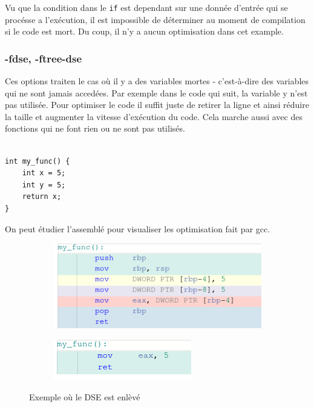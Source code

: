 \documentclass[11pt]{article} %
\begin{document}
Vu que la condition dans le \verb|if| est dependant sur une donn\'ee d'entr\'ee qui se proc\'esse a l'ex\'ecution, il est impossible de d\'eterminer
au moment de compilation si le code est mort. Du coup, il n'y a aucun optimisation dans cet example.

\subsubsection*{-fdse, -ftree-dse}

Ces options traiten le cas o\`u il y a des variables mortes - c'est-\`a-dire des variables qui ne sont jamais acced\'ees.
Par exemple dans le code qui suit, la variable y n’est pas utilisée. Pour optimiser le code il suffit juste de retirer la ligne et ainsi
réduire la taille et augmenter la vitesse d’exécution du code. Cela marche aussi avec des fonctions qui ne font rien ou ne sont pas utilisés.

\begin{verbatim}

int my_func() {
    int x = 5;
    int y = 5;
    return x;
}
\end{verbatim}


On peut \'etudier l'assembl\'e pour visualiser les optimisation fait par gcc.

\begin{figure}[h!]
    \centering
    \begin{subfigure}[h!]{0.4\textwidth}
        \includegraphics[width=\linewidth]{media/myfuncO0.png}
    \end{subfigure}
    \begin{subfigure}[h!]{0.4\textwidth}
        \includegraphics[width=\linewidth]{media/myfuncO1.png}
    \end{subfigure}
    \caption{Exemple o\`u le DSE est enl\`ev\'e}
\end{figure}
\end{document}
